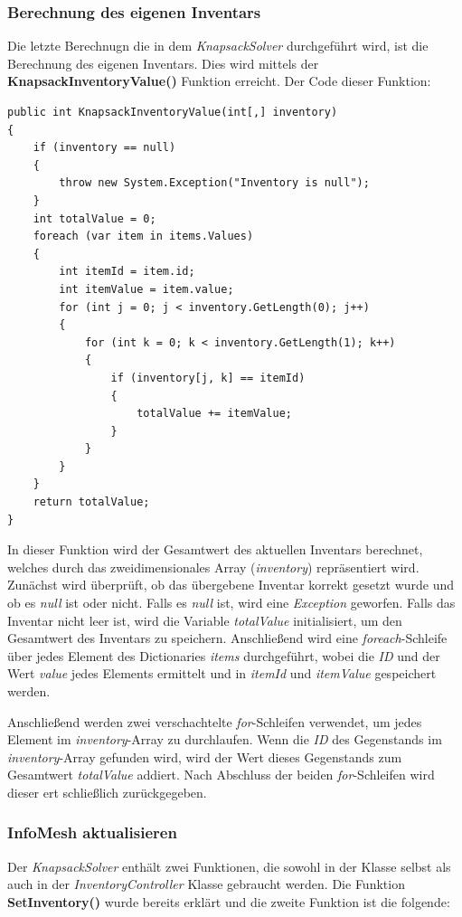 \subsubsection{Berechnung des eigenen Inventars}
Die letzte Berechnugn die in dem \textit{KnapsackSolver} durchgeführt wird, ist die Berechnung des eigenen Inventars. Dies
wird mittels der \textbf{KnapsackInventoryValue()} Funktion erreicht. Der Code dieser Funktion:
\begin{lstlisting}[style=csharp, caption={Funktion um eigenes Inventar zu brechnen}]
public int KnapsackInventoryValue(int[,] inventory)
{
    if (inventory == null)
    {
        throw new System.Exception("Inventory is null");
    }
    int totalValue = 0;
    foreach (var item in items.Values)
    {
        int itemId = item.id;
        int itemValue = item.value;
        for (int j = 0; j < inventory.GetLength(0); j++)
        {
            for (int k = 0; k < inventory.GetLength(1); k++)
            {
                if (inventory[j, k] == itemId)
                {
                    totalValue += itemValue;
                }
            }
        }
    }
    return totalValue;
}
\end{lstlisting}
In dieser Funktion wird der Gesamtwert des aktuellen Inventars berechnet, welches durch das zweidimensionales Array
(\textit{inventory}) repräsentiert wird. Zunächst wird überprüft, ob das übergebene Inventar korrekt gesetzt wurde und
ob es \textit{null} ist oder nicht. Falls es \textit{null} ist, wird eine \textit{Exception} geworfen. Falls das Inventar
nicht leer ist, wird die Variable \textit{totalValue} initialisiert, um den Gesamtwert des Inventars zu speichern.
Anschließend wird eine \textit{foreach}-Schleife über jedes Element des Dictionaries \textit{items} durchgeführt, wobei
die \textit{ID} und der Wert \textit{value} jedes Elements ermittelt und in \textit{itemId} und \textit{itemValue}
gespeichert werden.

Anschließend werden zwei verschachtelte \textit{for}-Schleifen verwendet, um jedes Element im \textit{inventory}-Array
zu durchlaufen. Wenn die \textit{ID} des Gegenstands im \textit{inventory}-Array gefunden wird, wird der Wert dieses
Gegenstands zum Gesamtwert \textit{totalValue} addiert. Nach Abschluss der beiden \textit{for}-Schleifen wird dieser
ert schließlich zurückgegeben.

\subsubsection{InfoMesh aktualisieren}
Der \textit{KnapsackSolver} enthält zwei Funktionen, die sowohl in der Klasse selbst als auch in der
\textit{InventoryController} Klasse gebraucht werden. Die Funktion \textbf{SetInventory()} wurde bereits erklärt und
die zweite Funktion ist die folgende:

